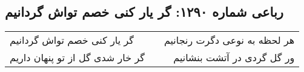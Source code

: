\begin{center}
\section*{رباعی شماره ۱۲۹۰: گر یار کنی خصم تواش گردانیم}
\label{sec:1290}
\begin{longtable}{l p{0.5cm} r}
گر یار کنی خصم تواش گردانیم
&&
هر لحظه به نوعی دگرت رنجانیم
\\
گر خار شدی گل از تو پنهان داریم
&&
ور گل گردی در آتشت بنشانیم
\\
\end{longtable}
\end{center}
